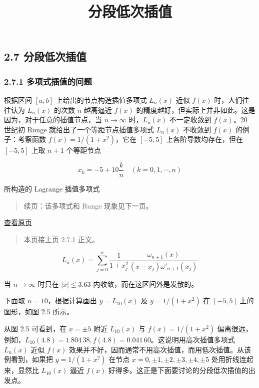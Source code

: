 \documentclass[
  10pt,
  fontset=fandol]{ctexart}
\title{分段低次插值}
\author{}
\date{}
\begin{document}
\maketitle

\subsection{2.7 分段低次插值}\label{ux5206ux6bb5ux4f4eux6b21ux63d2ux503c}

\subsubsection{2.7.1 多项式插值的问题}\label{ux591aux9879ux5f0fux63d2ux503cux7684ux95eeux9898}

根据区间 \([a,b]\) 上给出的节点构造插值多项式 \(L_n(x)\) 近似 \(f(x)\) 时，人们往往认为 \(L_n(x)\) 的次数 \(n\) 越高逼近 \(f(x)\) 的精度越好，但实际上并非如此。这是因为，对于任意的插值节点，当 \(n\to\infty\) 时，\(L_n(x)\) 不一定收敛到 \(f(x)\)。20 世纪初 Runge 就给出了一个等距节点插值多项式 \(L_n(x)\) 不收敛到 \(f(x)\) 的例子：考察函数 \(f(x)=1/(1+x^2)\)，它在 \([-5,5]\) 上各阶导数均存在，但在 \([-5,5]\) 上取 \(n+1\) 个等距节点

\[x_k=-5+10\frac{k}{n}\quad(k=0,1,\cdots,n)\]

所构造的 Lagrange 插值多项式

\begin{quote}
续页：该多项式和 Runge 现象见下一页。
\end{quote}

\href{../../source-images/pdf-046.jpeg}{查看原页}

\begin{quote}
本页接上页 2.7.1 正文。
\end{quote}

\[L_n(x)=\sum_{j=0}^n\frac{1}{1+x_j^2}\frac{\omega_{n+1}(x)}{(x-x_j)\omega'_{n+1}(x_j)}\]

当 \(n\to\infty\) 时只在 \(|x|\leqslant3.63\) 内收敛，而在这区间外是发散的。

下面取 \(n=10\)，根据计算画出 \(y=L_{10}(x)\) 及 \(y=1/(1+x^2)\) 在 \([-5,5]\) 上的图形，如图 2.5 所示。

从图 2.5 可看到，在 \(x=\pm5\) 附近 \(L_{10}(x)\) 与 \(f(x)=1/(1+x^2)\) 偏离很远，例如，\(L_{10}(4.8)=1.804\,38,f(4.8)=0.041\,60\)。这说明用高次插值多项式 \(L_n(x)\) 近似 \(f(x)\) 效果并不好，因而通常不用高次插值，而用低次插值。从该例看到，如果把 \(y=1/(1+x^2)\) 在节点 \(x=0,\allowbreak \pm1,\allowbreak \pm2,\allowbreak \pm3,\allowbreak \pm4,\allowbreak \pm5\) 处用折线连起来，显然比 \(L_{10}(x)\) 逼近 \(f(x)\) 好得多。这正是下面要讨论的分段低次插值的出发点。
\end{document}
